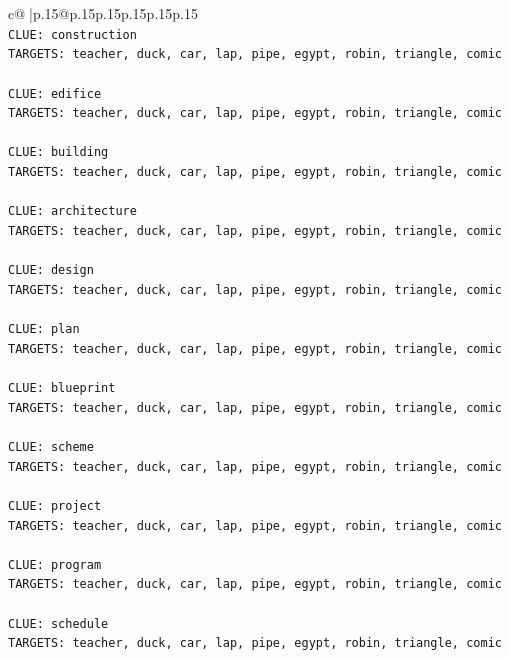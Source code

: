 \documentclass{article}
\begin{document}
{\begin{supertabular}{c@{$\;$}|p{.15\linewidth}@{}p{.15\linewidth}p{.15\linewidth}p{.15\linewidth}p{.15\linewidth}p{.15\linewidth}}
{{{\\ 
\texttt{CLUE: construction} \\
\texttt{TARGETS: teacher, duck, car, lap, pipe, egypt, robin, triangle, comic} \\
\\ 
\texttt{CLUE: edifice} \\
\texttt{TARGETS: teacher, duck, car, lap, pipe, egypt, robin, triangle, comic} \\
\\ 
\texttt{CLUE: building} \\
\texttt{TARGETS: teacher, duck, car, lap, pipe, egypt, robin, triangle, comic} \\
\\ 
\texttt{CLUE: architecture} \\
\texttt{TARGETS: teacher, duck, car, lap, pipe, egypt, robin, triangle, comic} \\
\\ 
\texttt{CLUE: design} \\
\texttt{TARGETS: teacher, duck, car, lap, pipe, egypt, robin, triangle, comic} \\
\\ 
\texttt{CLUE: plan} \\
\texttt{TARGETS: teacher, duck, car, lap, pipe, egypt, robin, triangle, comic} \\
\\ 
\texttt{CLUE: blueprint} \\
\texttt{TARGETS: teacher, duck, car, lap, pipe, egypt, robin, triangle, comic} \\
\\ 
\texttt{CLUE: scheme} \\
\texttt{TARGETS: teacher, duck, car, lap, pipe, egypt, robin, triangle, comic} \\
\\ 
\texttt{CLUE: project} \\
\texttt{TARGETS: teacher, duck, car, lap, pipe, egypt, robin, triangle, comic} \\
\\ 
\texttt{CLUE: program} \\
\texttt{TARGETS: teacher, duck, car, lap, pipe, egypt, robin, triangle, comic} \\
\\ 
\texttt{CLUE: schedule} \\
\texttt{TARGETS: teacher, duck, car, lap, pipe, egypt, robin, triangle, comic} \\
\\ 
}}}
\end{supertabular}}
\end{document}
